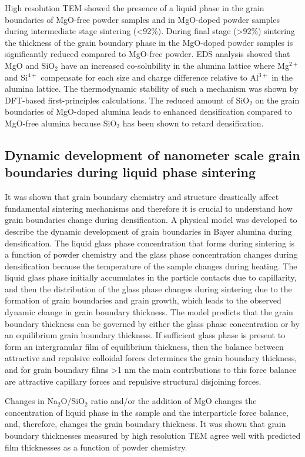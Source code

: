 High resolution TEM showed the presence of a liquid phase in the grain boundaries of MgO-free powder samples and in MgO-doped powder samples during intermediate stage sintering (<92\%). During final stage (>92\%) sintering the thickness of the grain boundary phase in the MgO-doped powder samples is significantly reduced compared to MgO-free powder. EDS analysis showed that MgO and SiO$_{2}$ have an increased co-solubility in the alumina lattice where Mg$^{2+}$ and Si$^{4+}$ compensate for each size and charge difference relative to Al$^{3+}$ in the alumina lattice. The thermodynamic stability of such a mechanism was shown by DFT-based first-principles calculations. The reduced amount of SiO$_{2}$ on the grain boundaries of MgO-doped alumina leads to enhanced densification compared to MgO-free alumina because SiO$_{2}$ has been shown to retard densification.

\subsection{Dynamic development of nanometer scale grain boundaries during liquid phase sintering}
It was shown that grain boundary chemistry and structure drastically affect fundamental sintering mechanisms and therefore it is crucial to understand how grain boundaries change during densification. A physical model was developed to describe the dynamic development of grain boundaries in Bayer alumina during densification. The liquid glass phase concentration that forms during sintering is a function of powder chemistry and the glass phase concentration changes during densification because the temperature of the sample changes during heating. The liquid glass phase initially accumulates in the particle contacts due to capillarity, and then the distribution of the glass phase changes during sintering due to the formation of grain boundaries and grain growth, which leads to the observed dynamic change in grain boundary thickness. The model predicts that the grain boundary thickness can be governed by either the glass phase concentration or by an equilibrium grain boundary thickness. If sufficient glass phase is present to form an intergranular film of equilibrium thickness, then the balance between attractive and repulsive colloidal forces determines the grain boundary thickness, and for grain boundary films >1 nm the main contributions to this force balance are attractive capillary forces and repulsive structural disjoining forces. 

Changes in Na$_{2}$O/SiO$_{2}$ ratio and/or the addition of MgO changes the concentration of liquid phase in the sample and the interparticle force balance, and, therefore, changes the grain boundary thickness. It was shown that grain boundary thicknesses measured by high resolution TEM agree well with predicted film thicknesses as a function of powder chemistry.  

